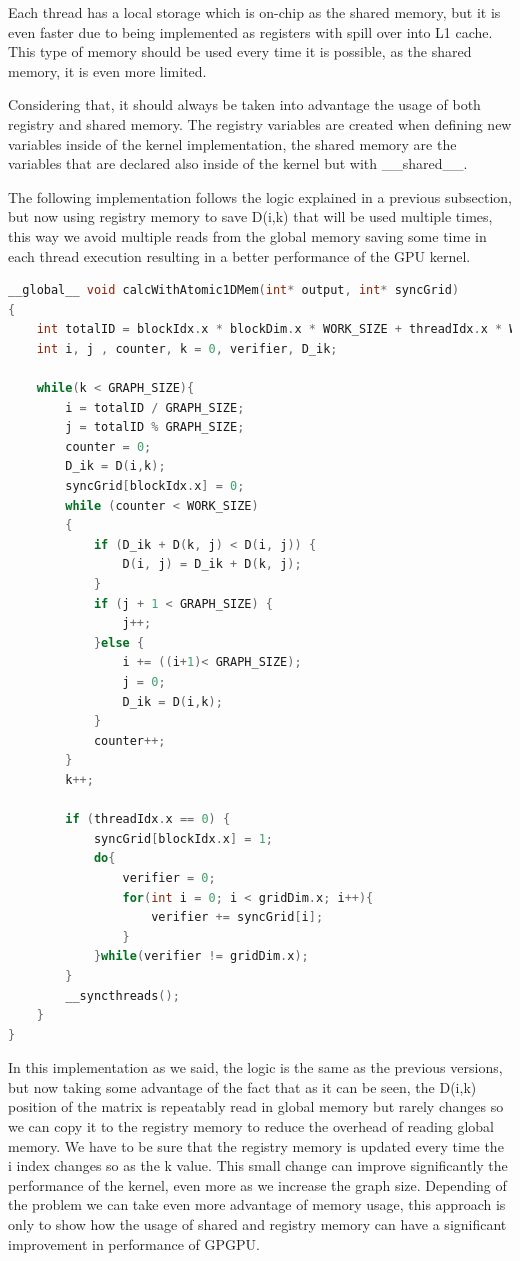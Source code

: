 \documentclass[conference]{IEEEtran}
\begin{document}
Each thread has a local storage which is on-chip as the shared memory, but it is even faster due to being implemented as registers with spill over into L1 cache. This type of memory should be used every time it is possible, as the shared memory, it is even more limited.

Considering that, it should always be taken into advantage the usage of both registry and shared memory. The registry variables are created when defining new variables inside of the kernel implementation, the shared memory are the variables that are declared also inside of the kernel but with \_\_shared\_\_.

The following implementation follows the logic explained in a previous subsection, but now using registry memory to save D(i,k) that will be used multiple times, this way we avoid multiple reads from the global memory saving some time in each thread execution resulting in a better performance of the GPU kernel.

\begin{lstlisting}[language=C++, caption=CUDA implementation with memory improvements]
__global__ void calcWithAtomic1DMem(int* output, int* syncGrid)
{
	int totalID = blockIdx.x * blockDim.x * WORK_SIZE + threadIdx.x * WORK_SIZE;
	int i, j , counter, k = 0, verifier, D_ik;

	while(k < GRAPH_SIZE){
		i = totalID / GRAPH_SIZE;
		j = totalID % GRAPH_SIZE;
		counter = 0;
		D_ik = D(i,k);
		syncGrid[blockIdx.x] = 0;
		while (counter < WORK_SIZE)
		{
			if (D_ik + D(k, j) < D(i, j)) {
				D(i, j) = D_ik + D(k, j);
			}
			if (j + 1 < GRAPH_SIZE) {
				j++;
			}else {
				i += ((i+1)< GRAPH_SIZE);
				j = 0;
				D_ik = D(i,k);
			}
			counter++;
		}
		k++;

		if (threadIdx.x == 0) {
			syncGrid[blockIdx.x] = 1;
			do{
				verifier = 0;
				for(int i = 0; i < gridDim.x; i++){
					verifier += syncGrid[i];
				}
			}while(verifier != gridDim.x);		
		}
		__syncthreads();
	}
}
\end{lstlisting}

In this implementation as we said, the logic is the same as the previous versions, but now taking some advantage of the fact that as it can be seen, the D(i,k) position of the matrix is repeatably read in global memory but rarely changes so we can copy it to the registry memory to reduce the overhead of reading global memory. We have to be sure that the registry memory is updated every time the i index changes so as the k value. This small change can improve significantly the performance of the kernel, even more as we increase the graph size. Depending of the problem we can take even more advantage of memory usage, this approach is only to show how the usage of shared and registry memory can have a significant improvement in performance of GPGPU.
\end{document}
